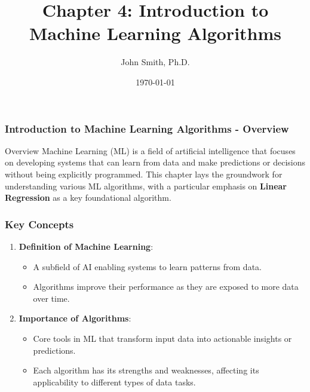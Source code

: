 \documentclass[aspectratio=169]{beamer}
\title[Machine Learning Algorithms]{Chapter 4: Introduction to Machine Learning Algorithms}
\author[J. Smith]{John Smith, Ph.D.}
\institute[University Name]{
  Department of Computer Science\\
  University Name\\
  \vspace{0.3cm}
  Email: email@university.edu\\
  Website: www.university.edu
}
\date{\today}
\begin{document}
\frame{\titlepage}

\begin{frame}[fragile]
    \frametitle{Introduction to Machine Learning Algorithms - Overview}
    \begin{block}{Overview}
        Machine Learning (ML) is a field of artificial intelligence that focuses on developing systems that can learn from data and make predictions or decisions without being explicitly programmed. This chapter lays the groundwork for understanding various ML algorithms, with a particular emphasis on \textbf{Linear Regression} as a key foundational algorithm.
    \end{block}
\end{frame}

\begin{frame}[fragile]
    \frametitle{Key Concepts}
    \begin{enumerate}
        \item \textbf{Definition of Machine Learning}: 
        \begin{itemize}
            \item A subfield of AI enabling systems to learn patterns from data.
            \item Algorithms improve their performance as they are exposed to more data over time.
        \end{itemize}

        \item \textbf{Importance of Algorithms}:
        \begin{itemize}
            \item Core tools in ML that transform input data into actionable insights or predictions.
            \item Each algorithm has its strengths and weaknesses, affecting its applicability to different types of data tasks.
        \end{itemize}
    \end{enumerate}
\end{frame}
\end{document}
